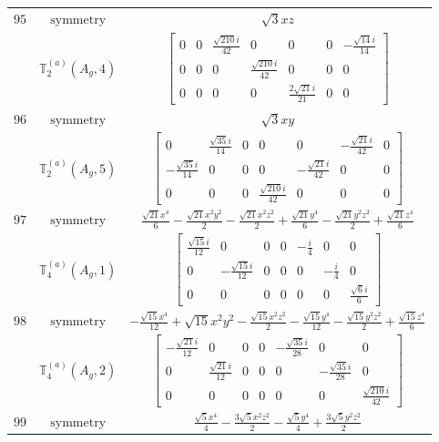 \documentclass[fleqn,8pt,landscape]{jsarticle}
\begin{document}
\begin{longtable}{ccc}
$ 95 $ & $ \text{symmetry} $ & $ \sqrt{3} x z $ \\
$  $ & $ \mathbb{T}_{2}^{(a)}(A_{g},4) $ & $ \begin{bmatrix} 0 & 0 & \frac{\sqrt{210} i}{42} & 0 & 0 & 0 & - \frac{\sqrt{14} i}{14} \\ 0 & 0 & 0 & \frac{\sqrt{210} i}{42} & 0 & 0 & 0 \\ 0 & 0 & 0 & 0 & \frac{2 \sqrt{21} i}{21} & 0 & 0 \end{bmatrix} $ \\ \hline
$ 96 $ & $ \text{symmetry} $ & $ \sqrt{3} x y $ \\
$  $ & $ \mathbb{T}_{2}^{(a)}(A_{g},5) $ & $ \begin{bmatrix} 0 & \frac{\sqrt{35} i}{14} & 0 & 0 & 0 & - \frac{\sqrt{21} i}{42} & 0 \\ - \frac{\sqrt{35} i}{14} & 0 & 0 & 0 & - \frac{\sqrt{21} i}{42} & 0 & 0 \\ 0 & 0 & 0 & \frac{\sqrt{210} i}{42} & 0 & 0 & 0 \end{bmatrix} $ \\ \hline
$ 97 $ & $ \text{symmetry} $ & $ \frac{\sqrt{21} x^{4}}{6} - \frac{\sqrt{21} x^{2} y^{2}}{2} - \frac{\sqrt{21} x^{2} z^{2}}{2} + \frac{\sqrt{21} y^{4}}{6} - \frac{\sqrt{21} y^{2} z^{2}}{2} + \frac{\sqrt{21} z^{4}}{6} $ \\
$  $ & $ \mathbb{T}_{4}^{(a)}(A_{g},1) $ & $ \begin{bmatrix} \frac{\sqrt{15} i}{12} & 0 & 0 & 0 & - \frac{i}{4} & 0 & 0 \\ 0 & - \frac{\sqrt{15} i}{12} & 0 & 0 & 0 & - \frac{i}{4} & 0 \\ 0 & 0 & 0 & 0 & 0 & 0 & \frac{\sqrt{6} i}{6} \end{bmatrix} $ \\ \hline
$ 98 $ & $ \text{symmetry} $ & $ - \frac{\sqrt{15} x^{4}}{12} + \sqrt{15} x^{2} y^{2} - \frac{\sqrt{15} x^{2} z^{2}}{2} - \frac{\sqrt{15} y^{4}}{12} - \frac{\sqrt{15} y^{2} z^{2}}{2} + \frac{\sqrt{15} z^{4}}{6} $ \\
$  $ & $ \mathbb{T}_{4}^{(a)}(A_{g},2) $ & $ \begin{bmatrix} - \frac{\sqrt{21} i}{12} & 0 & 0 & 0 & - \frac{\sqrt{35} i}{28} & 0 & 0 \\ 0 & \frac{\sqrt{21} i}{12} & 0 & 0 & 0 & - \frac{\sqrt{35} i}{28} & 0 \\ 0 & 0 & 0 & 0 & 0 & 0 & \frac{\sqrt{210} i}{42} \end{bmatrix} $ \\ \hline
$ 99 $ & $ \text{symmetry} $ & $ \frac{\sqrt{5} x^{4}}{4} - \frac{3 \sqrt{5} x^{2} z^{2}}{2} - \frac{\sqrt{5} y^{4}}{4} + \frac{3 \sqrt{5} y^{2} z^{2}}{2} $ \\

\end{longtable}
\end{document}
